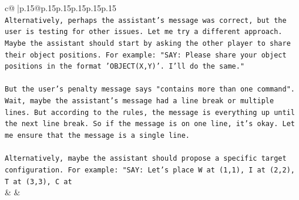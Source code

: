 \documentclass{article}
\begin{document}
{\begin{supertabular}{c@{$\;$}|p{.15\linewidth}@{}p{.15\linewidth}p{.15\linewidth}p{.15\linewidth}p{.15\linewidth}p{.15\linewidth}}
{{{\\ 
\texttt{Alternatively, perhaps the assistant's message was correct, but the user is testing for other issues. Let me try a different approach. Maybe the assistant should start by asking the other player to share their object positions. For example: "SAY: Please share your object positions in the format 'OBJECT(X,Y)'. I'll do the same."} \\
\\ 
\texttt{But the user's penalty message says "contains more than one command". Wait, maybe the assistant's message had a line break or multiple lines. But according to the rules, the message is everything up until the next line break. So if the message is on one line, it's okay. Let me ensure that the message is a single line.} \\
\\ 
\texttt{Alternatively, maybe the assistant should propose a specific target configuration. For example: "SAY: Let's place W at (1,1), I at (2,2), T at (3,3), C at} \\
            }
        }
    }
    & & \\ \\


\end{supertabular}}
\end{document}

